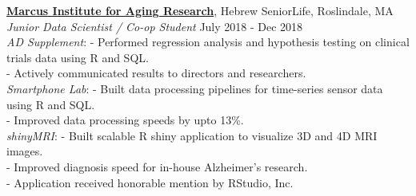 \documentclass[a4paper]{article}
\newcommand{\mybullet}{
	\indent 
  \textbullet \hspace*{2mm}
}
\begin{document}
  \noindent
  \textbf{\href{https://www.marcusinstituteforaging.org/}{Marcus Institute for Aging Research}}, 
  Hebrew SeniorLife, Roslindale, MA \\
        \textit{Junior Data Scientist / Co-op Student} \hfill July 2018 - Dec 2018 \\
        \mybullet \textit{AD Supplement}: 
        \hspace*{3.7 mm} - Performed regression analysis and hypothesis testing
        on clinical trials data using R and SQL. \\
        \hspace*{37.5 mm} - Actively communicated results to directors and researchers.  \\
        \mybullet \textit{Smartphone Lab}: 
        \hspace* {2.3 mm} - Built data processing pipelines for time-series sensor data using R and SQL. \\
        \hspace*{37.5 mm} - Improved data processing speeds by upto 13\%. \\ 
        \mybullet \textit{shinyMRI}: 
        \hspace* {12.7 mm} - Built scalable R shiny application to visualize 3D and 4D MRI images. \\
        \hspace*{37.5 mm} - Improved diagnosis speed for in-house Alzheimer's research. \\
        \hspace*{37.5 mm} - Application received honorable mention by RStudio, Inc. \\
        
	
\end{document}
